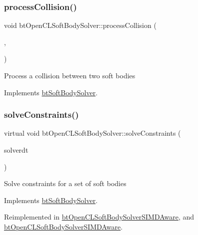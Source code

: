 \subsubsection{\texorpdfstring{process\+Collision()}{processCollision()}\hspace{0.1cm}{\footnotesize\ttfamily [2/2]}}
{\footnotesize\ttfamily void bt\+Open\+C\+L\+Soft\+Body\+Solver\+::process\+Collision (\begin{DoxyParamCaption}\item[{\hyperlink{classbtSoftBody}{bt\+Soft\+Body} $\ast$}]{,  }\item[{\hyperlink{classbtSoftBody}{bt\+Soft\+Body} $\ast$}]{ }\end{DoxyParamCaption})\hspace{0.3cm}{\ttfamily [virtual]}}

Process a collision between two soft bodies 

Implements \hyperlink{classbtSoftBodySolver_a08f03a574f0936d834ff100f87755ea6}{bt\+Soft\+Body\+Solver}.

\mbox{\label{classbtOpenCLSoftBodySolver_af418daf793b0cfe4d0af908e5cd43360}} 
\subsubsection{\texorpdfstring{solve\+Constraints()}{solveConstraints()}\hspace{0.1cm}{\footnotesize\ttfamily [1/2]}}
{\footnotesize\ttfamily virtual void bt\+Open\+C\+L\+Soft\+Body\+Solver\+::solve\+Constraints (\begin{DoxyParamCaption}\item[{float}]{solverdt }\end{DoxyParamCaption})\hspace{0.3cm}{\ttfamily [virtual]}}

Solve constraints for a set of soft bodies 

Implements \hyperlink{classbtSoftBodySolver_a5e71a2a32786574bedf409ba822980eb}{bt\+Soft\+Body\+Solver}.



Reimplemented in \hyperlink{classbtOpenCLSoftBodySolverSIMDAware_a38d944c9dcaa0579e001f93da1b5244d}{bt\+Open\+C\+L\+Soft\+Body\+Solver\+S\+I\+M\+D\+Aware}, and \hyperlink{classbtOpenCLSoftBodySolverSIMDAware_aac2e9d5582da958b0943b6e04f7f4c5a}{bt\+Open\+C\+L\+Soft\+Body\+Solver\+S\+I\+M\+D\+Aware}.

